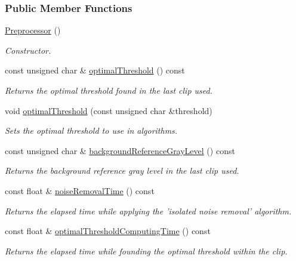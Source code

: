 \subsubsection*{Public Member Functions}
\begin{CompactItemize}
\item 
\hyperlink{class_preprocessor_da966c8b83e7c3bcd8759549c3cdf688}{Preprocessor} ()
\begin{CompactList}\small\item\em Constructor. \item\end{CompactList}\item 
const unsigned char \& \hyperlink{class_preprocessor_a44dff024a5b29752780bd4aa0d53d81}{optimalThreshold} () const 
\begin{CompactList}\small\item\em Returns the optimal threshold found in the last clip used. \item\end{CompactList}\item 
void \hyperlink{class_preprocessor_1fc44d7d19944f3c3addd3a576c37414}{optimalThreshold} (const unsigned char \&threshold)
\begin{CompactList}\small\item\em Sets the optimal threshold to use in algorithms. \item\end{CompactList}\item 
const unsigned char \& \hyperlink{class_preprocessor_b435116619b7b254d9e788476c012e8a}{backgroundReferenceGrayLevel} () const 
\begin{CompactList}\small\item\em Returns the background reference gray level in the last clip used. \item\end{CompactList}\item 
const float \& \hyperlink{class_preprocessor_ff8eee937760e42c0c2bea307849ada1}{noiseRemovalTime} () const 
\begin{CompactList}\small\item\em Returns the elapsed time while applying the 'isolated noise removal' algorithm. \item\end{CompactList}\item 
const float \& \hyperlink{class_preprocessor_72aa2eb5f3a7e7ee0d3ca27ddd6bfc5e}{optimalThresholdComputingTime} () const 
\begin{CompactList}\small\item\em Returns the elapsed time while founding the optimal threshold within the clip. \item\end{CompactList}\item 

\end{CompactItemize}
